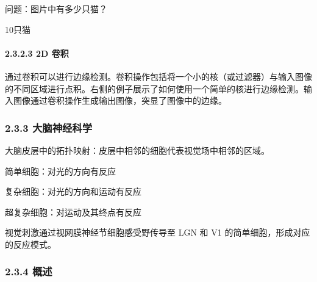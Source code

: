 问题：图片中有多少只猫？


10只猫


\paragraph{\texorpdfstring{\textbf{2.3.2.3 2D
卷积}}{2.3.2.3 2D 卷积}}\label{2323-2d-ux5377ux79ef}

通过卷积可以进行边缘检测。卷积操作包括将一个小的核（或过滤器）与输入图像的不同区域进行点积。右侧的例子展示了如何使用一个简单的核进行边缘检测。输入图像通过卷积操作生成输出图像，突显了图像中的边缘。


\subsubsection{\texorpdfstring{\textbf{2.3.3}
\textbf{大脑神经科学}}{2.3.3 大脑神经科学}}\label{233-ux5927ux8111ux795eux7ecfux79d1ux5b66}

大脑皮层中的拓扑映射：皮层中相邻的细胞代表视觉场中相邻的区域。

简单细胞：对光的方向有反应

复杂细胞：对光的方向和运动有反应

超复杂细胞：对运动及其终点有反应

视觉刺激通过视网膜神经节细胞感受野传导至 LGN 和 V1
的简单细胞，形成对应的反应模式。


\subsubsection{\texorpdfstring{\textbf{2.3.4}
\textbf{概述}}{2.3.4 概述}}\label{234-ux6982ux8ff0}



